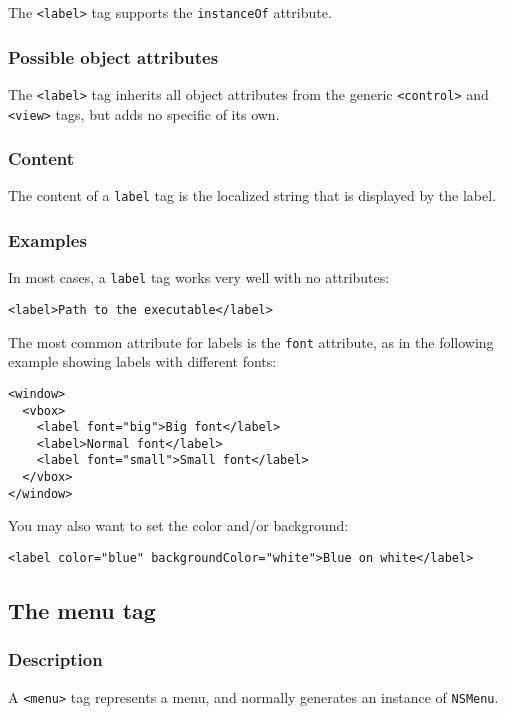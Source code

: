 The \texttt{<label>} tag supports the \texttt{instanceOf} attribute.

\subsubsection{Possible object attributes}
The \texttt{<label>} tag inherits all object attributes from the
generic \texttt{<control>} and \texttt{<view>} tags, but adds no
specific of its own.

\subsubsection{Content}
The content of a \texttt{label} tag is the localized string that is
displayed by the label.

\subsubsection{Examples}
In most cases, a \texttt{label} tag works very well with no attributes:
\begin{verbatim}
<label>Path to the executable</label>
\end{verbatim}

The most common attribute for labels is the \texttt{font} attribute,
as in the following example showing labels with different fonts:
\begin{verbatim}
<window>
  <vbox>
    <label font="big">Big font</label>
    <label>Normal font</label>
    <label font="small">Small font</label>
  </vbox>
</window>
\end{verbatim}

You may also want to set the color and/or background:
\begin{verbatim}
<label color="blue" backgroundColor="white">Blue on white</label>
\end{verbatim}

\subsection{The menu tag}

\subsubsection{Description}
A \texttt{<menu>} tag represents a menu, and normally generates an
instance of \texttt{NSMenu}.

